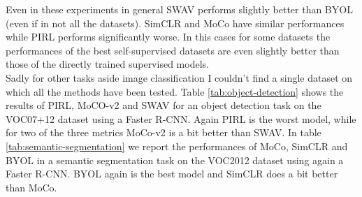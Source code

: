 \begin{table}[H]
	\centering
	\caption{Accuracy of fine-tuning on different datasets using ResNet50}
	\label{tab:classification-multi-dataset-finetune}
\end{table}
\noindent Even in these experiments in general SWAV performs slightly better than BYOL (even if in not all the datasets). SimCLR and MoCo have similar performances while PIRL performs significantly worse. In this cases for some datasets the performances of the best self-supervised datasets are even slightly better than those of the directly trained supervised models.\\
Sadly for other tasks aside image classification I couldn't find a single dataset on which all the methods have been tested. Table \ref{tab:object-detection} shows the results of PIRL, MoCO-v2 and SWAV for an object detection task on the VOC07+12 dataset using a Faster R-CNN. Again PIRL is the worst model, while for two of the three metrics MoCo-v2 is a bit better than SWAV. In table \ref{tab:semantic-segmentation} we report the performances of MoCo, SimCLR and BYOL in a semantic segmentation task on the VOC2012 dataset using again a Faster R-CNN. BYOL again is the best model and SimCLR does a bit better than MoCo.
